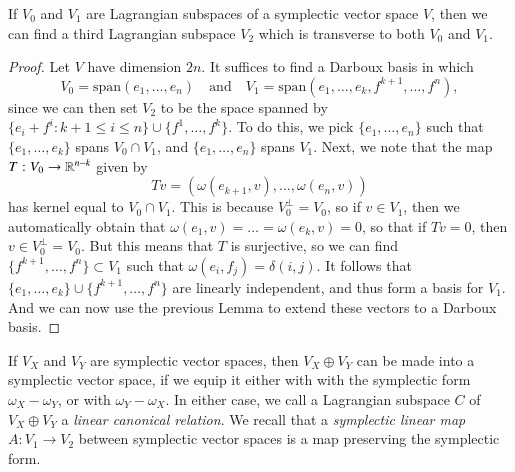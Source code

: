 \begin{lemma}
    If $V_0$ and $V_1$ are Lagrangian subspaces of a symplectic vector space $V$, then we can find a third Lagrangian subspace $V_2$ which is transverse to both $V_0$ and $V_1$.
\end{lemma}
\begin{proof}
    Let $V$ have dimension $2n$. It suffices to find a Darboux basis in which
    \[ V_0 = \text{span}(e_1,\dots,e_n) \quad\text{and}\quad V_1 = \text{span}(e_1,\dots,e_k,f^{k+1},\dots,f^n), \]
    since we can then set $V_2$ to be the space spanned by $\{ e_i + f^i : k+1 \leq i \leq n \} \cup \{ f^1, \dots, f^k \}$. To do this, we pick $\{  e_1, \dots, e_n \}$ such that $\{ e_1, \dots, e_k \}$ spans $V_0 \cap V_1$, and $\{ e_1,\dots, e_n \}$ spans $V_1$. Next, we note that the map $T: V_0 \to \operatorname{\mathbb{R}}^{n-k}$ given by
    \[ Tv = (\omega(e_{k+1},v), \dots, \omega(e_n,v)) \]
    has kernel equal to $V_0 \cap V_1$. This is because $V_0^\perp = V_0$, so if $v \in V_1$, then we automatically obtain that $\omega(e_1,v) = \dots = \omega(e_k,v) = 0$, so that if $Tv = 0$, then $v \in V_0^\perp = V_0$. But this means that $T$ is surjective, so we can find $\{ f^{k+1},\dots,f^n \} \subset V_1$ such that $\omega(e_i,f_j) = \delta(i,j)$. It follows that $\{ e_1,\dots,e_k \} \cup \{ f^{k+1},\dots,f^n \}$ are linearly independent, and thus form a basis for $V_1$. And we can now use the previous Lemma to extend these vectors to a Darboux basis.
\end{proof}

If $V_X$ and $V_Y$ are symplectic vector spaces, then $V_X \oplus V_Y$ can be made into a symplectic vector space, if we equip it either with with the symplectic form $\omega_X - \omega_Y$, or with $\omega_Y - \omega_X$. In either case, we call a Lagrangian subspace $C$ of $V_X \oplus V_Y$ a \emph{linear canonical relation}. We recall that a \emph{symplectic linear map} $A: V_1 \to V_2$ between symplectic vector spaces is a map preserving the symplectic form.

